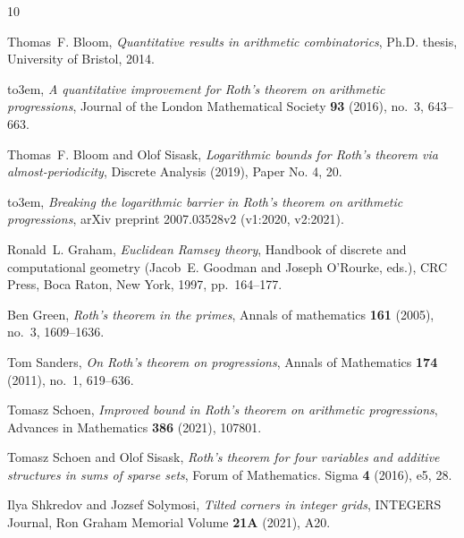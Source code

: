 \documentclass{daj}
\theoremstyle{definition}
\begin{document}

\providecommand{\bysame}{\leavevmode\hbox to3em{\hrulefill}\thinspace}
\providecommand{\MR}{\relax\ifhmode\unskip\space\fi MR }
\providecommand{\MRhref}[2]{%
  \href{http://www.ams.org/mathscinet-getitem?mr=#1}{#2}
}
\providecommand{\href}[2]{#2}
\begin{thebibliography}{10}

Thomas~F. Bloom, \emph{Quantitative results in arithmetic combinatorics}, Ph.D.
  thesis, University of Bristol, 2014.

\bysame, \emph{A quantitative improvement for {R}oth's theorem on arithmetic
  progressions}, Journal of the London Mathematical Society \textbf{93} (2016),
  no.~3, 643--663.

Thomas~F. Bloom and Olof Sisask, \emph{Logarithmic bounds for {R}oth’s
  theorem via almost-periodicity}, Discrete Analysis (2019), Paper No. 4, 20.

\bysame, \emph{Breaking the logarithmic barrier in {R}oth's theorem on
  arithmetic progressions}, arXiv preprint 2007.03528v2 (v1:2020, v2:2021).

Ronald~L. Graham, \emph{Euclidean {R}amsey theory}, Handbook of discrete and
  computational geometry (Jacob~E. Goodman and Joseph O'Rourke, eds.), CRC
  Press, Boca Raton, New York, 1997, pp.~164--177.

Ben Green, \emph{Roth's theorem in the primes}, Annals of mathematics
  \textbf{161} (2005), no.~3, 1609--1636.

Tom Sanders, \emph{On {R}oth's theorem on progressions}, Annals of Mathematics
  \textbf{174} (2011), no.~1, 619--636.

Tomasz Schoen, \emph{Improved bound in {R}oth's theorem on arithmetic
  progressions}, Advances in Mathematics \textbf{386} (2021), 107801.

Tomasz Schoen and Olof Sisask, \emph{Roth’s theorem for four variables and
  additive structures in sums of sparse sets}, Forum of Mathematics. Sigma
  \textbf{4} (2016), e5, 28.

Ilya Shkredov and Jozsef Solymosi, \emph{Tilted corners in integer grids},
  INTEGERS Journal, Ron Graham Memorial Volume \textbf{21A} (2021), A20.

\end{thebibliography}
\end{document}
